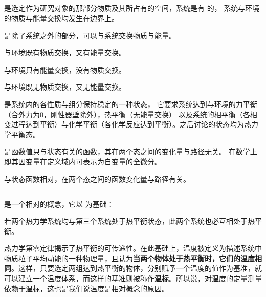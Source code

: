         \subsection[基本概念]{}
            \begin{Itemize}
                \item {} 是选定作为研究对象的那部分物质及其所占有的空间，系统是有 \linebreak 的，
                系统与环境的物质与能量交换均发生在边界上。
                \item {} 是除了系统之外的部分，可以与系统交换物质与能量。
                \item {} 与环境既有物质交换，又有能量交换。
                \item {} 与环境只有能量交换，没有物质交换。
                \item {} 与环境既无物质交换，又无能量交换。
                \item {} 是系统内的各性质与组分保持稳定的一种状态，
                它要求系统达到与环境的力平衡（合外力为0，刚性器壁除外），热平衡（无能量交换）
                以及系统的相平衡（各相变过程达到平衡）与化学平衡（各化学反应达到平衡）。之后讨论的状态均为热力学平衡态。
                \item {} 是函数值只与状态有关的函数，其在两个态之间的变化量与路径无关。
                在数学上即其因变量在定义域内可表示为自变量的全微分。
                \item {} 与状态函数相对，在两个态之间的函数变化量与路径有关。
            \end{Itemize}
        \subsection[温度]{}
             是一个相对的概念，它以 为基础：
            \begin{law}
                若两个热力学系统均与第三个系统处于热平衡状态，此两个系统也必互相处于热平衡。
            \end{law}
          
            热力学第零定律揭示了热平衡的可传递性。在此基础上，温度被定义为描述系统中物质粒子平均动能的一种物理量，且认为\textbf{当两个物体处于热平衡时，它们的温度相同}。这样，只要选定两组达到热平衡的物体，分别赋予一个温度的值作为基准，就可以建立一个温度体系，而这样的基准则被称作\textbf{温标}。所以说，对温度的定量测量依赖于温标，这也是我们说温度是相对概念的原因。
			
